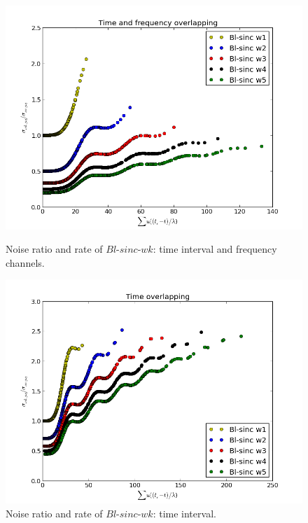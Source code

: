 \documentclass[useAMS,usenatbib]{mn2e}
\begin{document}
\begin{figure}
 \centering
\begin{minipage}{0.36\linewidth}\includegraphics[width=1\textwidth]{./Figures/time_freq_ration.png}\caption{Noise ratio and rate 
of $Bl$-$sinc$-$wk$: time interval and frequency channels.}\label{ fig:fig_2a } \end{minipage}
\begin{minipage}{0.36\linewidth}\includegraphics[width=1\textwidth]{./Figures/timeration.png}\caption{Noise ratio and rate of 
$Bl$-$sinc$-$wk$: time interval.}\label{fig:fig_2b}
\end{minipage}
\end{figure}
\end{document}
